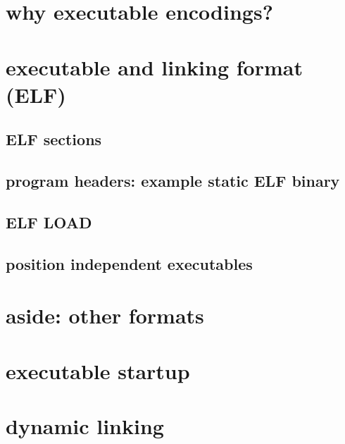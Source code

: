 \section{why executable encodings?}


\section{executable and linking format (ELF)}



\subsection{ELF sections}




\subsection{program headers: example static ELF binary}



\subsection{ELF LOAD}


\subsection{position independent executables}



\section{aside: other formats}



\section{executable startup} %



\section{dynamic linking}

